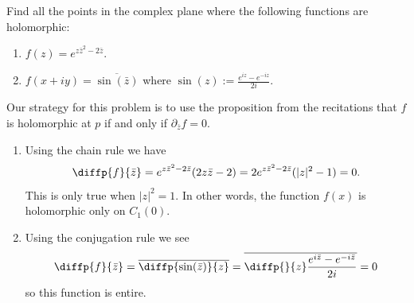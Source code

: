 \documentclass[11pt,a4paper]{article}
\begin{document}
\begin{exercise}
  Find all the points in the complex plane where the following functions
  are holomorphic:
  \begin{enumerate}
    \item[(1)] $f(z) = e^{z \bar z^2 - 2 \bar z}$.
    \item[(2)] $f(x + i y) = \overline{\sin(\bar z)}$ where
      $\sin(z) := \frac{e^{i z} - e^{-i z}}{2 i}$.
  \end{enumerate}
\end{exercise}
\begin{solution}
  Our strategy for this problem is to use the proposition from the recitations
  that $f$ is holomorphic at $p$ if and only if $\partial_{\bar z} f = 0$.
\begin{enumerate}
\item[(1)] Using the chain rule we have
  \[
    \diffp{f}{{\bar z}} = 
    e^{z \bar z^2 - 2 \bar z}(2 z \bar z - 2) =
    2 e^{z \bar z^2 - 2 \bar z}(|z|^2 - 1) =
    0.
  \]
  This is only true when $|z|^2 = 1$.
  In other words, the function $f(x)$ is holomorphic only on $C_1(0)$.
\item[(2)] Using the conjugation rule we see
  \[
    \diffp{f}{{\bar z}} =
    \overline{\diffp{\sin(\bar z)}{z}} =
    \overline{\diffp{}{z} \frac{e^{i \bar z} - e^{-i \bar z}}{2 i}} = 0
  \]
  so this function is entire.
\end{enumerate}
\end{solution}
\end{document}
